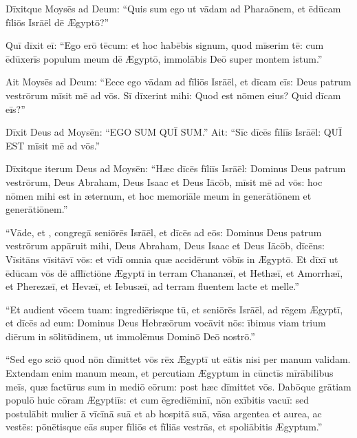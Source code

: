 Dīxitque Moysēs ad Deum: ``Quis sum ego ut vādam ad Pharaōnem,
et ēdūcam fīliōs Isrāēl dē Ægyptō?''

Quī dīxit eī: ``Ego erō tēcum: et hoc habēbis signum,
quod mīserim tē: cum ēdūxerīs populum meum dē Ægyptō,
immolābis Deō super montem istum.''

Ait Moysēs ad Deum: ``Ecce ego vādam ad fīliōs Isrāēl,
et dīcam eīs: Deus patrum vestrōrum mīsit mē ad vōs.
Sī dīxerint mihi: Quod est nōmen eius? Quid dīcam eīs?''

Dīxit Deus ad Moysēn: ``EGO SUM QUĪ SUM.'' Ait: ``Sīc dīcēs fīliīs Isrāēl: QUĪ EST mīsit mē ad vōs.''

Dīxitque iterum Deus ad Moysēn: ``Hæc dīcēs fīliīs Isrāēl:
Dominus Deus patrum vestrōrum, Deus Abraham, Deus Isaac et Deus Iācōb,
 mīsit mē ad vōs: hoc nōmen mihi est in æternum,
et hoc memoriāle meum in generātiōnem et generātiōnem.''

``Vāde, et , congregā seniōrēs Isrāēl,
et dīcēs ad eōs: Dominus Deus patrum vestrōrum appāruit mihi,
Deus Abraham, Deus Isaac et Deus Iācōb,
dīcēns: Vīsitāns vīsitāvī vōs: et vīdī omnia quæ accidērunt vōbīs in Ægyptō.
Et dīxī ut ēdūcam vōs dē afflīctiōne Ægyptī in terram Chananæī,
et Hethæī, et Amorrhæī, et Pherezæī, et Hevæī, et Iebusæī,
ad terram fluentem lacte et melle.''

``Et audient vōcem tuam: ingrediērisque tū,
et seniōrēs Isrāēl, ad rēgem Ægyptī, et dīcēs ad eum:
Dominus Deus Hebræōrum vocāvit nōs:
ībimus viam trium diērum in sōlitūdinem,
ut immolēmus Dominō Deō nostrō.''

``Sed ego sciō quod nōn dīmittet vōs rēx Ægyptī
ut eātis nisi per manum validam.
Extendam enim manum meam, et percutiam Ægyptum
in cūnctīs mīrābilibus meīs, 
quæ factūrus sum in mediō eōrum:
post hæc dīmittet vōs.
Dabōque grātiam populō huic cōram Ægyptiīs:
et cum ēgrediēminī, nōn exībitis vacuī:
sed postulābit mulier ā vīcīnā suā
et ab hospitā suā, vāsa argentea et aurea, ac vestēs:
pōnētisque eās super fīliōs et fīliās vestrās, et spoliābitis Ægyptum.''
